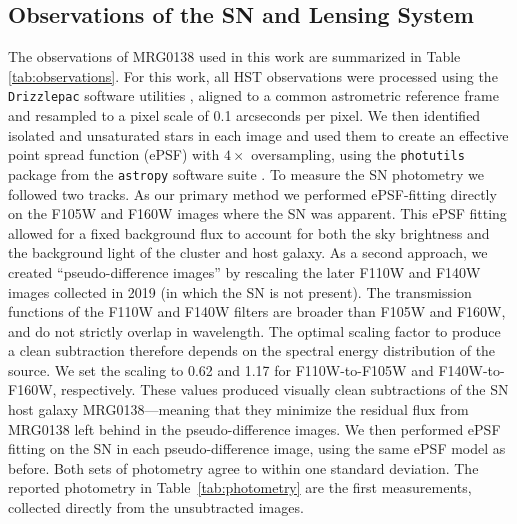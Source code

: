 \documentclass[12pt,dvipsnames]{article}
\begin{document}
\subsection*{Observations of the SN and Lensing System}

The observations of MRG0138 used in this work are  summarized in Table \ref{tab:observations}.   For this work, all HST observations were processed using the {\tt Drizzlepac} software utilities \cite{gonzaga_drizzlepac_2012}, aligned to a common astrometric reference frame and resampled to a pixel scale of 0.1 arcseconds per pixel.  We then identified isolated and unsaturated stars in each image and used them to create an effective point spread function (ePSF) with $4\times$ oversampling, using the {\tt photutils} package from the {\tt astropy} software suite \cite{astropy_citation_needed}.   To measure the SN photometry we followed two tracks.  As our primary method we performed ePSF-fitting directly on the F105W and F160W images where the SN was apparent.  This ePSF fitting allowed for a fixed background flux to account for both the sky brightness and the background light of the cluster and host galaxy.  
As a second approach, we created ``pseudo-difference images'' by rescaling the later F110W and F140W images collected in 2019 (in which the SN is not present).  The transmission functions of the F110W and F140W filters are broader than F105W and F160W, and do not strictly overlap in wavelength.  The optimal scaling factor to produce a clean subtraction therefore depends on the spectral energy distribution of the source.  We set the scaling to 0.62 and 1.17 for F110W-to-F105W and F140W-to-F160W, respectively.  These values produced visually clean subtractions of the SN host galaxy MRG0138---meaning that they minimize the residual flux from MRG0138 left behind in the pseudo-difference images.  We then performed ePSF fitting on the SN in each pseudo-difference image, using the same ePSF model as before.   Both sets of photometry agree to within one standard deviation.  The reported photometry in Table~\ref{tab:photometry} are the first  measurements, collected directly from the unsubtracted images.
\end{document}
